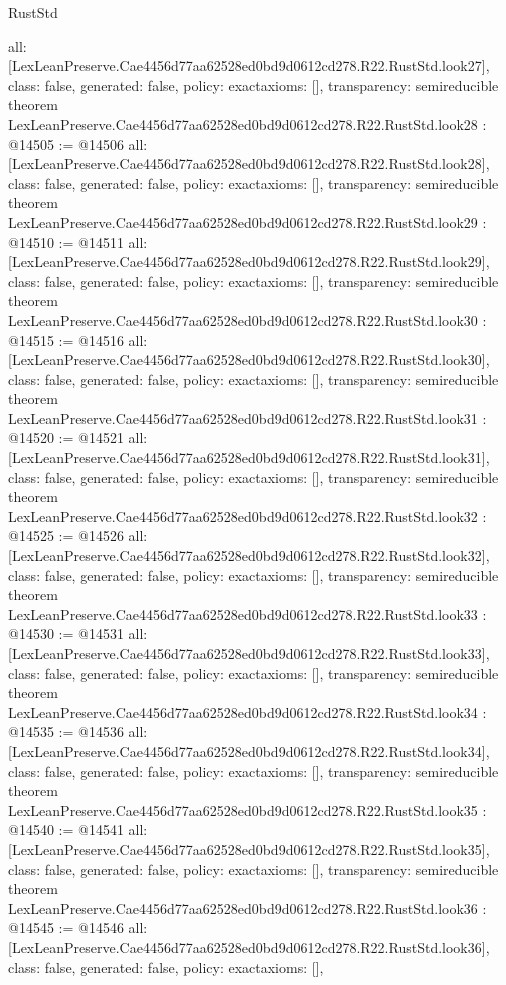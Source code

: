 \begin{lexlean}{RustStd}
\begin{coremodule}
{  all: [LexLeanPreserve.Cae4456d77aa62528ed0bd9d0612cd278.R22.RustStd.look27],
  class: false,
  generated: false,
  policy: exact{axioms: []},
  transparency: semireducible
}
theorem LexLeanPreserve.Cae4456d77aa62528ed0bd9d0612cd278.R22.RustStd.look28 : @14505 := @14506 {
  all: [LexLeanPreserve.Cae4456d77aa62528ed0bd9d0612cd278.R22.RustStd.look28],
  class: false,
  generated: false,
  policy: exact{axioms: []},
  transparency: semireducible
}
theorem LexLeanPreserve.Cae4456d77aa62528ed0bd9d0612cd278.R22.RustStd.look29 : @14510 := @14511 {
  all: [LexLeanPreserve.Cae4456d77aa62528ed0bd9d0612cd278.R22.RustStd.look29],
  class: false,
  generated: false,
  policy: exact{axioms: []},
  transparency: semireducible
}
theorem LexLeanPreserve.Cae4456d77aa62528ed0bd9d0612cd278.R22.RustStd.look30 : @14515 := @14516 {
  all: [LexLeanPreserve.Cae4456d77aa62528ed0bd9d0612cd278.R22.RustStd.look30],
  class: false,
  generated: false,
  policy: exact{axioms: []},
  transparency: semireducible
}
theorem LexLeanPreserve.Cae4456d77aa62528ed0bd9d0612cd278.R22.RustStd.look31 : @14520 := @14521 {
  all: [LexLeanPreserve.Cae4456d77aa62528ed0bd9d0612cd278.R22.RustStd.look31],
  class: false,
  generated: false,
  policy: exact{axioms: []},
  transparency: semireducible
}
theorem LexLeanPreserve.Cae4456d77aa62528ed0bd9d0612cd278.R22.RustStd.look32 : @14525 := @14526 {
  all: [LexLeanPreserve.Cae4456d77aa62528ed0bd9d0612cd278.R22.RustStd.look32],
  class: false,
  generated: false,
  policy: exact{axioms: []},
  transparency: semireducible
}
theorem LexLeanPreserve.Cae4456d77aa62528ed0bd9d0612cd278.R22.RustStd.look33 : @14530 := @14531 {
  all: [LexLeanPreserve.Cae4456d77aa62528ed0bd9d0612cd278.R22.RustStd.look33],
  class: false,
  generated: false,
  policy: exact{axioms: []},
  transparency: semireducible
}
theorem LexLeanPreserve.Cae4456d77aa62528ed0bd9d0612cd278.R22.RustStd.look34 : @14535 := @14536 {
  all: [LexLeanPreserve.Cae4456d77aa62528ed0bd9d0612cd278.R22.RustStd.look34],
  class: false,
  generated: false,
  policy: exact{axioms: []},
  transparency: semireducible
}
theorem LexLeanPreserve.Cae4456d77aa62528ed0bd9d0612cd278.R22.RustStd.look35 : @14540 := @14541 {
  all: [LexLeanPreserve.Cae4456d77aa62528ed0bd9d0612cd278.R22.RustStd.look35],
  class: false,
  generated: false,
  policy: exact{axioms: []},
  transparency: semireducible
}
theorem LexLeanPreserve.Cae4456d77aa62528ed0bd9d0612cd278.R22.RustStd.look36 : @14545 := @14546 {
  all: [LexLeanPreserve.Cae4456d77aa62528ed0bd9d0612cd278.R22.RustStd.look36],
  class: false,
  generated: false,
  policy: exact{axioms: []},
}
\end{coremodule}
\end{lexlean}
